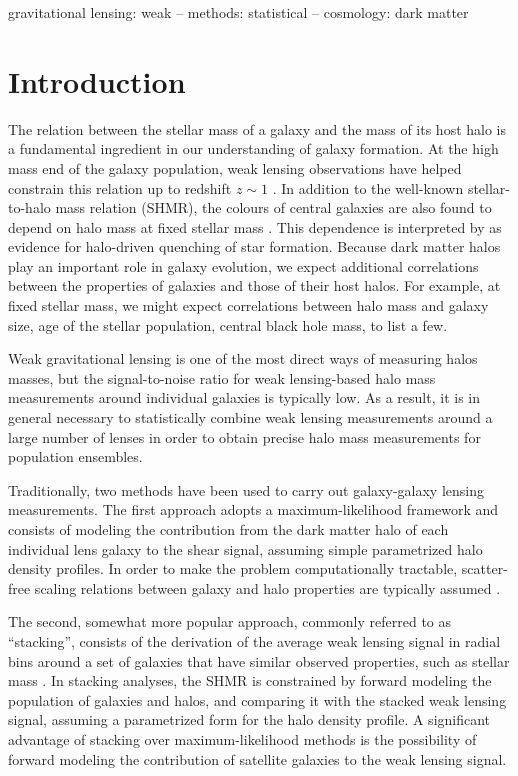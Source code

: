 \documentclass[usenatbib]{mnras}
\begin{document}
\begin{keywords}
   gravitational lensing: weak -- methods: statistical -- cosmology: dark matter
\end{keywords}

\section{Introduction}\label{sect:intro}
The relation between the stellar mass of a galaxy and the mass of its host halo is a fundamental ingredient in our understanding of galaxy formation.
At the high mass end of the galaxy population, weak lensing observations have helped constrain this relation up to redshift $z\sim1$ \citep[e.g.][]{Man++06, Lea++12, Cou++15, Z+M15}.
In addition to the well-known stellar-to-halo mass relation (SHMR), the colours of central galaxies are also found to depend on halo mass at fixed stellar mass \citep[see e.g.][]{Hoe++05, Man++06, Tinker2013, Man++16}.
This dependence is interpreted by \citet{Z+M16} as evidence for halo-driven quenching of star formation. Because dark matter halos play an important role in galaxy evolution, we expect additional correlations between the properties of galaxies and those of their host halos. For example, at fixed stellar mass, we might expect correlations between halo mass and galaxy size, age of the stellar population, central black hole mass, to list a few.

Weak gravitational lensing is one of the most direct ways of measuring halos masses, but the signal-to-noise ratio for weak lensing-based halo mass measurements around individual galaxies is typically low.
As a result, it is in general necessary to statistically combine weak lensing measurements around a large number of lenses in order to obtain precise halo mass measurements for population ensembles.

Traditionally, two methods have been used to carry out galaxy-galaxy lensing measurements.
The first approach adopts a maximum-likelihood framework and consists of modeling the contribution from the dark matter halo of each individual lens galaxy to the shear signal, assuming simple parametrized halo density profiles. In order to make the problem computationally tractable, scatter-free scaling relations between galaxy and halo properties are typically assumed \citep[e.g.][]{S+R97, Hud++98, HYG04, LKN05, Han++15}. 

The second, somewhat more popular approach, commonly referred to as ``stacking'',  consists of the derivation of the average weak lensing signal in radial bins around a set of galaxies that have similar observed properties, such as stellar mass \citep[e.g.][]{Hoe++01, Par++05, Man++06b, Lea++12, Vel++14, Bro++16}.
In stacking analyses, the SHMR is constrained by forward modeling the population of galaxies and halos, and comparing it with the stacked weak lensing signal, assuming a parametrized form for the halo density profile.
A significant advantage of stacking over maximum-likelihood methods is the possibility of forward modeling the contribution of satellite galaxies to the weak lensing signal. 
\end{document}
